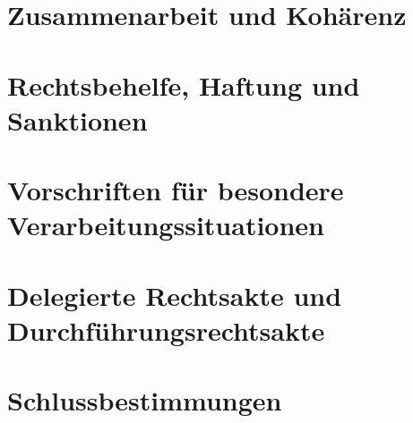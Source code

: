 

\part{Zusammenarbeit und Kohärenz}
\label{part:7}


\part{Rechtsbehelfe, Haftung und Sanktionen}
\label{part:8}


\part{Vorschriften für besondere Verarbeitungssituationen}
\label{part:9}

\part{Delegierte Rechtsakte und Durchführungsrechtsakte}
\label{part:10}


\part{Schlussbestimmungen}
\label{part:11}



